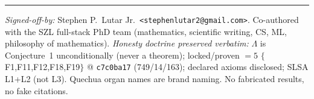 \documentclass[11pt]{article}
\theoremstyle{plain}
\theoremstyle{definition}
\theoremstyle{remark}
\newcommand{\La}{\Lambda}
\begin{document}
\vspace{1em}\hrule\vspace{0.5em}
\noindent\small\textit{Signed-off-by:} Stephen P.\ Lutar Jr.\ \texttt{<stephenlutar2@gmail.com>}.
Co-authored with the SZL full-stack PhD team (mathematics, scientific writing, CS, ML,
philosophy of mathematics). \textit{Honesty doctrine preserved verbatim:} $\La$ is
Conjecture~1 unconditionally (never a theorem); locked/proven $=5$
$\{$F1,F11,F12,F18,F19$\}$ @ \texttt{c7c0ba17} (749/14/163); declared axioms disclosed;
SLSA L1+L2 (not L3). Quechua organ names are brand naming. No fabricated results, no
fake citations.\normalsize
\end{document}
